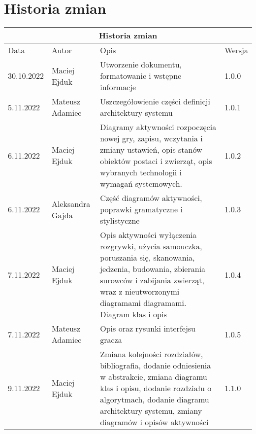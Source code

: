 \chapter{Historia zmian}

\begin{center}
    \begin{longtable}{ |l|l|p{6cm}|l|  }
        \hline
        \multicolumn{4}{|c|}{Historia zmian} \\
        \hline
        Data & Autor & Opis & Wersja\\
        \hline
        30.10.2022 & Maciej Ejduk & Utworzenie dokumentu, formatowanie i wstępne informacje & 1.0.0\\
        \hline
        5.11.2022 & Mateusz Adamiec & Uszczegółowienie części definicji architektury systemu & 1.0.1\\
        \hline
        6.11.2022 & Maciej Ejduk & Diagramy aktywności rozpoczęcia nowej gry, zapisu, wczytania i zmiany ustawień, opis stanów obiektów postaci i zwierząt, opis wybranych technologii i wymagań systemowych. & 1.0.2\\
        \hline
        6.11.2022 & Aleksandra Gajda & Część diagramów aktywności, poprawki gramatyczne i stylistyczne & 1.0.3\\
        \hline
        7.11.2022 & Maciej Ejduk & Opis aktywności wyłączenia rozgrywki, użycia samouczka, poruszania się, skanowania, jedzenia, budowania, zbierania surowców i zabijania zwierząt, wraz z nieutworzonymi diagramami diagramami. Diagram klas i opis & 1.0.4\\
        \hline
        7.11.2022 & Mateusz Adamiec & Opis oraz rysunki interfejsu gracza & 1.0.5\\
        \hline
        9.11.2022 & Maciej Ejduk & Zmiana kolejności rozdziałów, bibliografia, dodanie odniesienia w abstrakcie, zmiana diagramu klas i opisu, dodanie rozdziału o algorytmach, dodanie diagramu architektury systemu, zmiany diagramów i opisów aktywności & 1.1.0\\
        \hline
    \end{longtable}
\end{center}